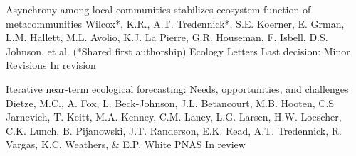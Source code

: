 

\begin{pubentries}

  \pubentry
    {Asynchrony among local communities stabilizes ecosystem function of metacommunities} %
    {Wilcox*, K.R., A.T. Tredennick*, S.E. Koerner, E. Grman, L.M. Hallett, M.L. Avolio, K.J. La Pierre, G.R. Houseman, F. Isbell, D.S. Johnson, et al. (*Shared first authorship)} %
    {Ecology Letters} %
    {Last decision: Minor Revisions} %
    {In revision} %

  \pubentry
    {Iterative near-term ecological forecasting: Needs, opportunities, and challenges} %
    {Dietze, M.C., A. Fox, L. Beck-Johnson, J.L. Betancourt, M.B. Hooten, C.S Jarnevich, T. Keitt, M.A. Kenney, C.M. Laney, L.G. Larsen, H.W. Loescher, C.K. Lunch, B. Pijanowski, J.T. Randerson, E.K. Read, A.T. Tredennick, R. Vargas, K.C. Weathers, \& E.P. White} %
    {PNAS} %
    {} %
    {In review} %

\end{pubentries}
